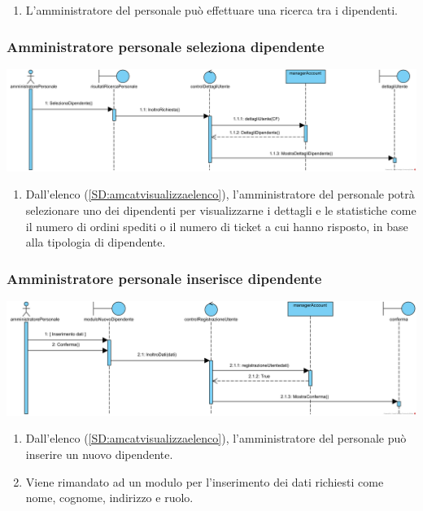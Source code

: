 \documentclass[12pt]{article}
\begin{document}
\begin{enumerate}
\item L'amministratore del personale può effettuare una ricerca tra i dipendenti.
\end{enumerate}

\subsubsection{Amministratore personale seleziona dipendente}
\label{SD:amperselezione}
\begin{center}
\includegraphics[width=\textwidth]{SequenceDiagram/AmministratorePersonaleDipendenteSeleziona}
\end{center}

\begin{enumerate}
\item Dall'elenco (\ref{SD:amcatvisualizzaelenco}), l'amministratore del personale potrà selezionare uno dei dipendenti per visualizzarne i dettagli e le statistiche come il numero di ordini spediti o il numero di ticket a cui hanno risposto, in base alla tipologia di dipendente.
\end{enumerate}

\subsubsection{Amministratore personale inserisce dipendente}
\label{SD:amperinserisce}
\begin{center}
\includegraphics[width=\textwidth]{SequenceDiagram/AmministratorePersonaleDipendenteInserisce}
\end{center}

\begin{enumerate}
\item Dall'elenco (\ref{SD:amcatvisualizzaelenco}), l'amministratore del personale può inserire un nuovo dipendente.
\item Viene rimandato ad un modulo per l'inserimento dei dati richiesti come nome, cognome, indirizzo e ruolo.
\end{enumerate}
\end{document}
